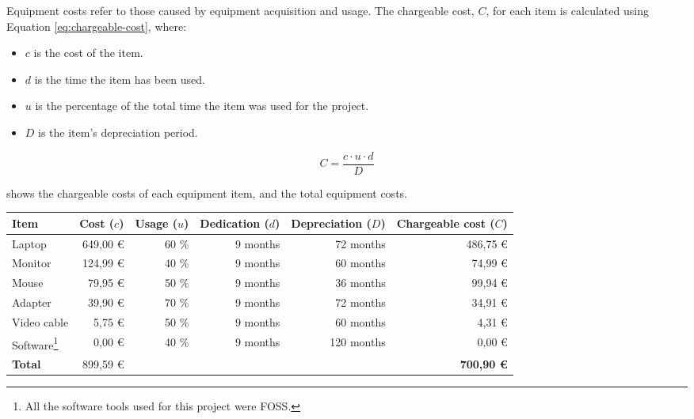 Equipment costs refer to those caused by equipment acquisition and usage. The chargeable cost, $C$, for each item is calculated using Equation \eqref{eq:chargeable-cost}, where:
\begin{itemize}
  \item $c$ is the cost of the item.
  \item $d$ is the time the item has been used.
  \item $u$ is the percentage of the total time the item was used for the project.
  \item $D$ is the item's depreciation period.
\end{itemize}

\begin{equation}\label{eq:chargeable-cost}
  C = \frac{c \cdot u \cdot d}{D}
\end{equation}

 shows the chargeable costs of each equipment item, and the total equipment costs.

\begin{table}[htb]
    {
      \begin{adjustbox}{max width=\textwidth}  %
        \begin{tabular}{lrrrrr}
          \toprule
          \textbf{Item} & \textbf{Cost ($c$)} & \textbf{Usage ($u$)} & \textbf{Dedication ($d$)} & \textbf{Depreciation ($D$)} & \textbf{Chargeable cost ($C$)}   \\
          \midrule
          Laptop      & 649,00 € & 60 \% & 9 months &  72 months & 486,75 € \\
          Monitor     & 124,99 € & 40 \% & 9 months &  60 months &  74,99 € \\
          Mouse       &  79,95 € & 50 \% & 9 months &  36 months &  99,94 € \\
          Adapter     &  39,90 € & 70 \% & 9 months &  72 months &  34,91 € \\
          Video cable &   5,75 € & 50 \% & 9 months &  60 months &   4,31 € \\
          Software\footnote{All the software tools used for this project were \gls{FOSS}.}
                      &   0,00 € & 40 \% & 9 months & 120 months &   0,00 € \\
          \midrule
          \textbf{Total}
                      & 899,59 € &       &          &           &\textbf{700,90 €} \\
          \bottomrule
        \end{tabular}
      \end{adjustbox}
    }
\end{table}


